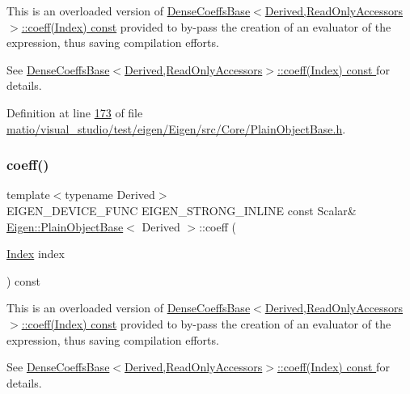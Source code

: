 This is an overloaded version of \hyperlink{group___core___module_ad52344ad1f42852db71996590d2de0de}{Dense\+Coeffs\+Base$<$\+Derived,\+Read\+Only\+Accessors$>$\+::coeff(\+Index) const} provided to by-\/pass the creation of an evaluator of the expression, thus saving compilation efforts.

See \hyperlink{group___core___module_ad52344ad1f42852db71996590d2de0de}{Dense\+Coeffs\+Base$<$\+Derived,\+Read\+Only\+Accessors$>$\+::coeff(\+Index) const }for details. 

Definition at line \hyperlink{matio_2visual__studio_2test_2eigen_2_eigen_2src_2_core_2_plain_object_base_8h_source_l00173}{173} of file \hyperlink{matio_2visual__studio_2test_2eigen_2_eigen_2src_2_core_2_plain_object_base_8h_source}{matio/visual\+\_\+studio/test/eigen/\+Eigen/src/\+Core/\+Plain\+Object\+Base.\+h}.

\mbox{\label{class_eigen_1_1_plain_object_base_af592e3993ea3d4ac9f073b42db2c04cc}} 
\subsubsection{\texorpdfstring{coeff()}{coeff()}\hspace{0.1cm}{\footnotesize\ttfamily [4/4]}}
{\footnotesize\ttfamily template$<$typename Derived$>$ \\
E\+I\+G\+E\+N\+\_\+\+D\+E\+V\+I\+C\+E\+\_\+\+F\+U\+NC E\+I\+G\+E\+N\+\_\+\+S\+T\+R\+O\+N\+G\+\_\+\+I\+N\+L\+I\+NE const Scalar\& \hyperlink{class_eigen_1_1_plain_object_base}{Eigen\+::\+Plain\+Object\+Base}$<$ Derived $>$\+::coeff (\begin{DoxyParamCaption}\item[{\hyperlink{namespace_eigen_a62e77e0933482dafde8fe197d9a2cfde}{Index}}]{index }\end{DoxyParamCaption}) const\hspace{0.3cm}{\ttfamily [inline]}}

This is an overloaded version of \hyperlink{group___core___module_ad52344ad1f42852db71996590d2de0de}{Dense\+Coeffs\+Base$<$\+Derived,\+Read\+Only\+Accessors$>$\+::coeff(\+Index) const} provided to by-\/pass the creation of an evaluator of the expression, thus saving compilation efforts.

See \hyperlink{group___core___module_ad52344ad1f42852db71996590d2de0de}{Dense\+Coeffs\+Base$<$\+Derived,\+Read\+Only\+Accessors$>$\+::coeff(\+Index) const }for details. 

